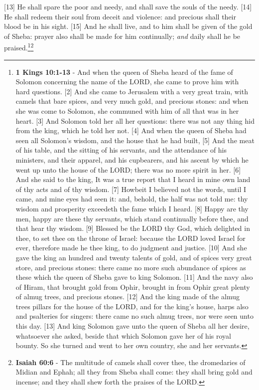 [13] \textcolor[cmyk]{0.99998,1,0,0}{He shall spare the poor and needy, and shall save the souls of the needy.}
[14] \textcolor[cmyk]{0.99998,1,0,0}{He shall redeem their soul from deceit and violence: and precious shall their blood be in his sight.}
[15] \textcolor[cmyk]{0.99998,1,0,0}{And he shall live, and to him shall be given of the gold of Sheba: prayer also shall be made for him continually; \emph{and} daily shall he be praised.}\footnote{\textbf{1 Kings 10:1-13} - And when the queen of Sheba heard of the fame of Solomon concerning the name of the LORD, she came to prove him with hard questions. [2] And she came to Jerusalem with a very great train, with camels that bare spices, and very much gold, and precious stones: and when she was come to Solomon, she communed with him of all that was in her heart. [3] And Solomon told her all her questions: there was not any thing hid from the king, which he told her not. [4] And when the queen of Sheba had seen all Solomon’s wisdom, and the house that he had built, [5] And the meat of his table, and the sitting of his servants, and the attendance of his ministers, and their apparel, and his cupbearers, and his ascent by which he went up unto the house of the LORD; there was no more spirit in her. [6] And she said to the king, It was a true report that I heard in mine own land of thy acts and of thy wisdom. [7] Howbeit I believed not the words, until I came, and mine eyes had seen it: and, behold, the half was not told me: thy wisdom and prosperity exceedeth the fame which I heard. [8] Happy are thy men, happy are these thy servants, which stand continually before thee, and that hear thy wisdom. [9] Blessed be the LORD thy God, which delighted in thee, to set thee on the throne of Israel: because the LORD loved Israel for ever, therefore made he thee king, to do judgment and justice. [10] And she gave the king an hundred and twenty talents of gold, and of spices very great store, and precious stones: there came no more such abundance of spices as these which the queen of Sheba gave to king Solomon. [11] And the navy also of Hiram, that brought gold from Ophir, brought in from Ophir great plenty of almug trees, and precious stones. [12] And the king made of the almug trees pillars for the house of the LORD, and for the king’s house, harps also and psalteries for singers: there came no such almug trees, nor were seen unto this day. [13] And king Solomon gave unto the queen of Sheba all her desire, whatsoever she asked, beside that which Solomon gave her of his royal bounty. So she turned and went to her own country, she and her servants.}\footnote{\textbf{Isaiah 60:6} - The multitude of camels shall cover thee, the dromedaries of Midian and Ephah; all they from Sheba shall come: they shall bring gold and incense; and they shall shew forth the praises of the LORD.}
